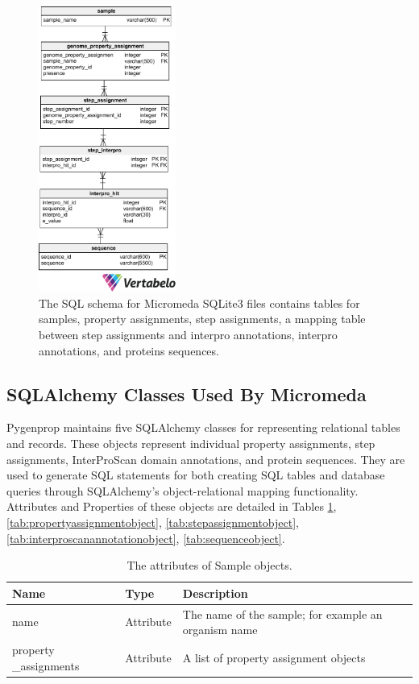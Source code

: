 \begin{figure}[!ht]
  \centering
	\includegraphics[width=0.40\textwidth]{media/micromeda_schema.pdf}
	 \caption{The SQL schema for Micromeda SQLite3 files contains tables for samples, property assignments, step assignments, a mapping table between step assignments and interpro annotations, interpro annotations, and proteins sequences.}
	 \label{fig:micromedaschema}
\end{figure}

\subsection{SQLAlchemy Classes Used By Micromeda} \label{sqlalchemy-classes}

Pygenprop maintains five SQLAlchemy classes for representing relational tables and records. These objects represent individual property assignments, step assignments, InterProScan domain annotations, and protein sequences. They are used to generate SQL statements for both creating SQL tables and database queries through SQLAlchemy's object-relational mapping functionality. Attributes and Properties of these objects are detailed in Tables \ref{tab:sampleobject}, \ref{tab:propertyassignmentobject}, \ref{tab:stepassignmentobject}, \ref{tab:interproscanannotationobject}, \ref{tab:sequenceobject}.

\begin{table}[!ht]
\centering
\caption{The attributes of Sample objects.}
\label{tab:sampleobject}
\begin{tabular}{|p{2.7cm}|p{2cm}|p{10cm}|}
\hline
\textbf{Name} & \textbf{Type} & \textbf{Description} \\ \hline
name & Attribute & The name of the sample; for example an organism name \\ \hline
property \_assignments & Attribute & A list of property assignment objects \\ \hline
\end{tabular}
\end{table}

